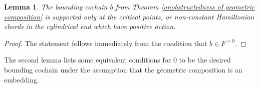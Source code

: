\documentclass{amsart}
\newtheorem{lemma}[theorem]{Lemma}
\numberwithin{equation}{section}
\numberwithin{figure}{section}
\begin{document}
\begin{lemma}
	The bounding cochain $b$ from Theorem \ref{unobstructedness of geometric composition} is supported only at the critical points, or non-constant Hamiltonian chords in the cylindrical end which have positive action. \par
\end{lemma}
\begin{proof}
	The statement follows immediately from the condition that $b \in F^{>0}$. \par
\end{proof}

	The second lemma lists some equivalent conditions for $0$ to be the desired bounding cochain under the assumption that the geometric composition is an embedding. \par
\end{document}
